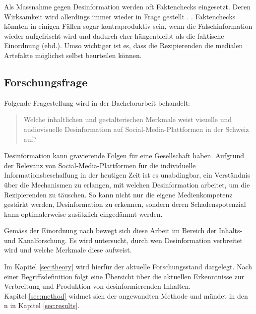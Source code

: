 \documentclass[12pt,a4paper]{article}        %
\begin{document}
Als Massnahme gegen Desinformation werden oft Faktenchecks eingesetzt. Deren Wirksamkeit wird allerdings immer wieder in Frage gestellt \parencites[1095]{lazer_science_2018}[4f]{ceron_fake_2021}.  \parencites[1095]{lazer_science_2018}\parencite[vgl.\ auch][18]{grujic_warnhinweise_2024}. Faktenchecks könnten in einigen Fällen sogar kontraproduktiv sein, wenn  die Falschinformation wieder aufgefrischt wird und dadurch eher hängenbleibt als die faktische Einordnung (ebd.). Umso wichtiger ist es, dass die Rezipierenden die medialen Artefakte möglichst selbst beurteilen können.

\subsection{Forschungsfrage}
\label{thesis}
Folgende Fragestellung wird in der Bachelorarbeit behandelt:
\begin{quote}
  Welche inhaltlichen und gestalterischen Merkmale weist visuelle und audiovisuelle Desinformation auf Social-Media-Plattformen in der Schweiz auf?
\end{quote}
Desinformation kann gravierende Folgen für eine Gesellschaft haben.
Aufgrund der Relevanz von Social-Media-Plattformen für die individuelle Informationsbeschaffung in der heutigen Zeit ist es unabdingbar, ein Verständnis über die Mechanismen zu erlangen, mit welchen Desinformation arbeitet, um die Rezipierenden zu täuschen. So kann nicht nur die eigene Medienkompetenz gestärkt werden, Desinformation zu erkennen, sondern deren Schadenspotenzial kann optimalerweise zusätzlich eingedämmt werden.

Gemäss der Einordnung nach \cite[37]{lasswell_lasswell_1948} bewegt sich diese Arbeit im Bereich der Inhalts- und Kanalforschung. Es wird untersucht, durch wen Desinformation verbreitet wird und welche Merkmale diese aufweist.

\label{structure}
Im Kapitel \ref{sec:theory}  wird hierfür der aktuelle Forschungsstand dargelegt. Nach einer Begriffsdefinition folgt eine Übersicht über die aktuellen Erkenntnisse zur Verbreitung und Produktion von desinformierenden Inhalten. \\
Kapitel \ref{sec:method}  widmet sich der angewandten Methode und mündet in den n in Kapitel \ref{sec:results}.
\end{document}

